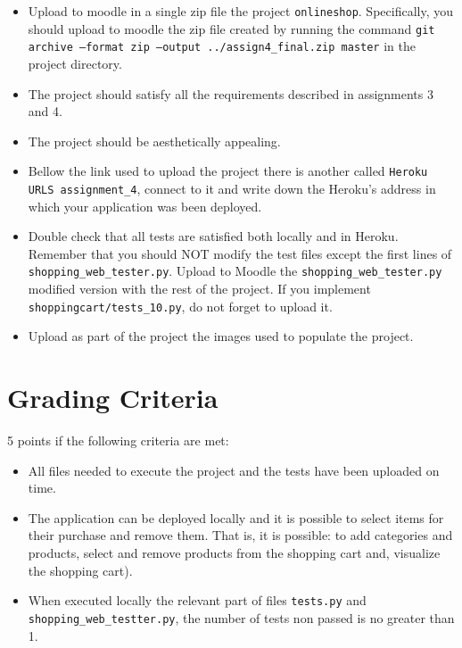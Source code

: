 \documentclass[12pt]{article} %
\newcounter{ejercicioNo}
\newcommand{\ttt}[1]{\texttt{#1}}%
\begin{document}
\begin{minipage}{\linewidth}
\begin{framed}
\addtocounter{ejercicioNo}{1} 
\begin{itemize}
\item Upload to moodle in a single zip file the project \texttt{onlineshop}.
Specifically, you should upload to moodle the  zip file created by running the command \texttt{git archive --format zip --output ../assign4\_final.zip  master}
in the project directory.

\item The project should satisfy all the requirements described in assignments 3 and 4. 

\item The project should be aesthetically appealing.

\item Bellow the link used to upload the project there is another called \texttt{Heroku URLS assignment\_4}, connect to it and write down the Heroku's address in which your application was been deployed.

\item Double check that all tests are satisfied both locally and in Heroku. Remember that you should NOT modify the test files except the first lines of \ttt{shopping\_web\_tester.py}. Upload to Moodle the \ttt{shopping\_web\_tester.py} modified version with the rest of the project. If you implement \ttt{shoppingcart/tests\_10.py}, do not forget to upload it.

\item Upload as part of the project the images used to populate the project. 

\end{itemize}


\end{framed}
\end{minipage}

\section{Grading Criteria}

5 points if the following criteria are met:
\begin{itemize}
 \item All files needed to execute the project and the tests have been uploaded on time.
 \item The application can be deployed locally and it is possible to select items for their purchase and remove them. That is, it is possible: to add categories and products, select and remove products from the shopping cart and, visualize the shopping cart).
  \item When executed locally the relevant part of files \ttt{tests.py} and \ttt{shopping\_web\_testter.py}, the number of tests  non passed is no greater than 1.
\end{itemize}
\end{document}
